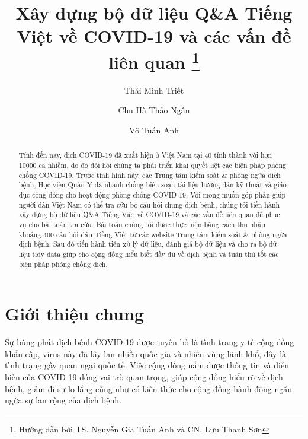 \documentclass[runningheads]{llncs}
\begin{document}
%
\title{Xây dựng bộ dữ liệu Q\&A Tiếng Việt về COVID-19 và các vấn đề liên quan \thanks{Hướng dẫn bởi TS. Nguyễn Gia Tuấn Anh và CN. Lưu Thanh Sơn}}
%
%
\author{Thái Minh Triết \and
Chu Hà Thảo Ngân \and
Võ Tuấn Anh}
%
%
%
\maketitle              %
%
\begin{abstract}
Tính đến nay, dịch COVID-19 đã xuất hiện ở Việt Nam tại 40 tỉnh thành với hơn 10000 ca nhiễm, do đó đòi hỏi chúng ta phải triển khai quyết liệt các biện pháp phòng chống COVID-19. Trước tình hình này, các Trung tâm kiểm soát \& phòng ngừa dịch bệnh, Học viên Quân Y đã nhanh chống biên soạn tài liệu hướng dẫn kỹ thuật và giáo dục cộng đồng cho hoạt động phòng chống COVID-19. Với mong muốn góp phần giúp người dân Việt Nam có thể tra cứu bộ câu hỏi chung dịch bệnh, chúng tôi tiến hành xây dựng bộ dữ liệu Q\&A Tiếng Việt về COVID-19 và các vấn đề liên quan để phục vụ cho bài toán tra cứu. Bài toán chúng tôi được thực hiện bằng cách thu nhập khoảng 400 câu hỏi đáp Tiếng Việt từ các website Trung tâm kiểm soát \& phòng ngừa dịch bệnh. Sau đó tiến hành tiền xử lý dữ liệu, đánh giá bộ dữ liệu và cho ra bộ dữ liệu tidy data giúp cho cộng đồng hiểu biết đầy đủ về dịch bệnh và tuân thủ tốt các biện pháp phòng chồng dịch.


\end{abstract}
%
%
%
\section{Giới thiệu chung}

Sự bùng phát dịch bệnh COVID-19 được tuyên bố là tình trang y tế cộng đồng khẩn cấp, virus này đã lây lan nhiều quốc gia và nhiều vùng lãnh khổ, đây là tình trạng gây quan ngại quốc tế. Việc cộng đồng nắm được thông tin và diễn biến của COVID-19 đóng vai trò quan trọng, giúp cộng đồng hiểu rõ về dịch bệnh, giảm đi sự lo lắng cũng như có kiến thức cho cộng đồng hành động ngăn ngừa sự lan rộng của dịch bệnh.
\end{document}
